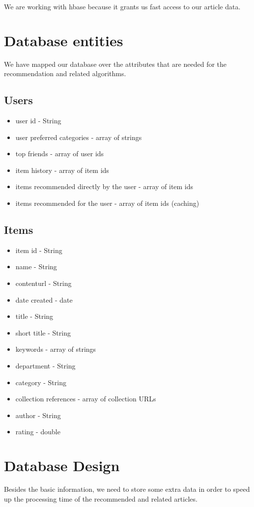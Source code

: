 We are working with hbase because it grants us fast access to our article data.

\section{Database entities}
\label{sec:database-entities}

We have mapped our database over the attributes that are needed for the recommendation and related algorithms.

\subsection{Users}
\label{sec:users}
\begin{itemize}
	\item user id - String
	\item user preferred categories - array of strings
	\item top friends - array of user ids
	\item item history - array of item ids
	\item items recommended directly by the user - array of item ids
	\item items recommended for the user - array of item ids (caching)
\end{itemize}

\subsection{Items}
\label{sec:items}
\begin{itemize}
	\item item id - String
	\item name - String
	\item contenturl - String
	\item date created - date
	\item title - String
	\item short title - String
	\item keywords - array of strings
	\item department - String
	\item category - String
	\item collection references - array of collection URLs
	\item author - String
	\item rating - double
\end{itemize}

\section{Database Design}
\label{sec:database-design}
Besides the basic information, we need to store some extra data in order to speed up the processing time of the recommended and related articles.

